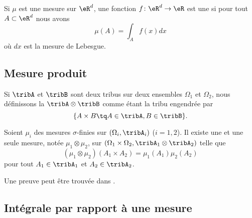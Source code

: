 Si \( \mu\) est une mesure sur \( \eR^d\), une fonction \( f\colon \eR^d\to \eR\) est une  si pour tout \( A\subset\eR^d\) nous avons
\begin{equation}
    \mu(A)=\int_Af(x)dx
\end{equation}
où \( dx\) est la mesure de Lebesgue.

\subsection{Mesure produit}

\begin{definition}      \label{DefTribProfGfYTuR}
    Si \( \tribA\) et \( \tribB\) sont deux tribus sur deux ensembles \( \Omega_1\) et \( \Omega_2\), nous définissons la  \( \tribA\otimes\tribB\) comme étant la tribu engendrée par 
    \begin{equation}
        \{ A\times B\tq A\in\tribA,B\in\tribB \}.
    \end{equation}
\end{definition}

\begin{theorem}
    Soient \( \mu_i\) des mesures $\sigma$-finies sur \( (\Omega_i,\tribA_i)\) (\( i=1,2\)). Il existe une et une seule mesure, notée \( \mu_1\otimes \mu_2\), sur \( (\Omega_1\times\Omega_2,\tribA_1\otimes\tribA_2)\) telle que
    \begin{equation}
        (\mu_1\otimes\mu_2)(A_1\times A_2)=\mu_1(A_1)\mu_2(A_2)
    \end{equation}
    pour tout \( A_1\in \tribA_1\) et \( A_2\in\tribA_2\).
\end{theorem}
Une preuve peut être trouvée dans \cite{FubiniBMauray}.

\subsection{Intégrale par rapport à une mesure}

